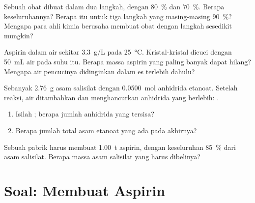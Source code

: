 \begin{exercise}[$\star\star\star$]\label{exo:g10:synthesis-yield:12}
Sebuah obat dibuat dalam dua langkah, dengan 
\qty{80}{\percent} dan \qty{70}{\percent}. Berapa 
keseluruhannya? Berapa  itu untuk tiga langkah yang
masing-masing \qty{90}{\percent}? Mengapa para ahli kimia berusaha
membuat obat dengan langkah sesedikit mungkin?
\end{exercise}

\begin{exercise}[$\star\star\star$]\label{exo:g10:synthesis-yield:13}
Aspirin  dalam air sekitar \qty{3.3}{g/L} pada
\qty{25}{\celsius}. Kristal-kristal dicuci dengan \qty{50}{mL} air pada
suhu itu. Berapa massa aspirin yang paling banyak dapat hilang? Mengapa
air pencucinya didinginkan dalam es terlebih dahulu?
\end{exercise}

\begin{exercise}[$\star\star\star$]\label{exo:g10:synthesis-yield:14}
Sebanyak \qty{2.76}{g} asam salisilat  dengan \qty{0.0500}{mol}
anhidrida etanoat. Setelah reaksi, air ditambahkan dan menghancurkan
anhidrida yang berlebih: .
\begin{enumerate}
  \item Isilah  ; berapa jumlah anhidrida yang
        tersisa?
  \item Berapa jumlah total asam etanoat yang ada pada akhirnya?
\end{enumerate}
\end{exercise}

\begin{exercise}[$\star\star\star$]\label{exo:g10:synthesis-yield:15}
Sebuah pabrik harus membuat \qty{1.00}{t} aspirin, dengan 
keseluruhan \qty{85}{\percent} dari asam salisilat. Berapa massa asam
salisilat yang harus dibelinya?
\end{exercise}

\section{Soal: Membuat Aspirin}

